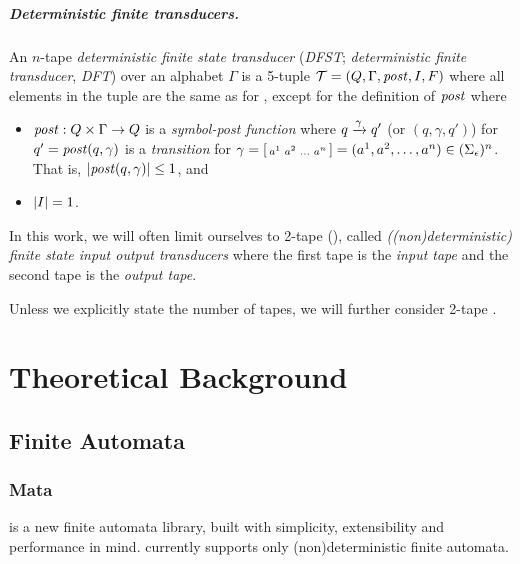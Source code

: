 \paragraph{Deterministic finite transducers.}
An $n$-tape \emph{deterministic finite state transducer} (\emph{DFST}; \emph{deterministic finite transducer}, \emph{DFT}) over an alphabet $\Gamma$ is a 5-tuple $\mathcal{T} = (Q, \Gamma, \mathit{post}, I, F)$ where all elements in the tuple are the same as for \nft, except for the definition of $\mathit{post}$ where
\begin{itemize}
    \item $\mathit{post}: Q \times \Gamma \rightarrow Q$ is a \emph{symbol-post function} where ${q} \xrightarrow{{\gamma}} {q'}$ (or $(q, \gamma, q')$) for $q' = \mathit{post}(q, \gamma)$ is a \emph{transition} for $\gamma = \begin{bsmallmatrix} a^1 & a^2 & \ldots & a^n\end{bsmallmatrix} = (a^1, a^2, \ldots, a^n) \in (\Sigma_\epsilon)^n$. That is, $|\mathit{post}(q, \gamma)| \leq 1$, and
    \item $|I| = 1$.
\end{itemize}


In this work, we will often limit ourselves to 2-tape \nfts (\dfts), called \emph{((non)deterministic) finite state input output transducers} where the first tape is the \emph{input tape} and the second tape is the \emph{output tape}.

Unless we explicitly state the number of tapes, we will further consider 2-tape \nfts.







\chapter{Theoretical Background}
\section{Finite Automata}
\subsection{Mata}

\mata is a new finite automata library, built with simplicity, extensibility and performance in mind.
\mata currently supports only (non)deterministic finite automata.

